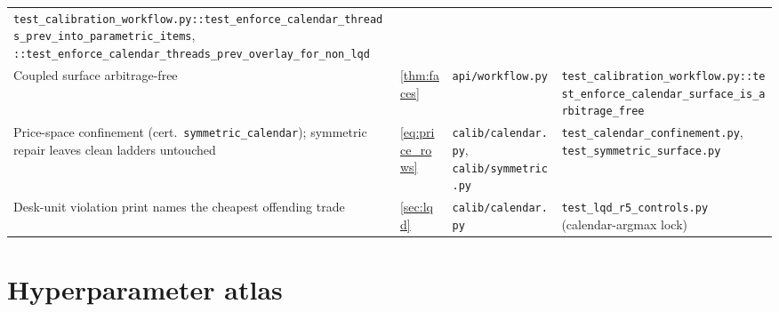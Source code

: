 \documentclass[11pt]{article}
\begin{document}
\begin{longtable}{@{}p{}p{}p{}p{}@{}}
\nolinkurl{test_calibration_workflow.py::test_enforce_calendar_threads_prev_into_parametric_items}, \nolinkurl{::test_enforce_calendar_threads_prev_overlay_for_non_lqd}\\
Coupled surface arbitrage-free &
\cref{thm:faces} &
\nolinkurl{api/workflow.py} &
\nolinkurl{test_calibration_workflow.py::test_enforce_calendar_surface_is_arbitrage_free}\\
\addlinespace
Price-space confinement (cert.\ \texttt{symmetric\_calendar}); symmetric
repair leaves clean ladders untouched &
\eqref{eq:price_rows} &
\nolinkurl{calib/calendar.py}, \nolinkurl{calib/symmetric.py} &
\nolinkurl{test_calendar_confinement.py}, \nolinkurl{test_symmetric_surface.py}\\
Desk-unit violation print names the cheapest offending trade &
\cref{sec:lqd} &
\nolinkurl{calib/calendar.py} &
\nolinkurl{test_lqd_r5_controls.py} (calendar-argmax lock)\\
\bottomrule
\end{longtable}
\endgroup

\appendix
\section{Hyperparameter atlas}
\label{app:atlas}
\end{document}
